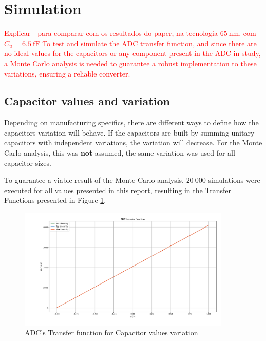 \section{Simulation}
\label{sec:simulation}


\textcolor{red}{Explicar - para comparar com os resultados do paper, na tecnologia $\SI{65}{\nano\meter}$, com $C_u = \SI{6.5}{\femto\farad}$ To test and simulate the ADC transfer function, and since there are no ideal values for the capacitors or any component present in the ADC in study, a Monte Carlo analysis is needed to guarantee a robust implementation to these variations, ensuring a reliable converter.}

\subsection{Capacitor values and variation}

Depending on manufacturing specifics, there are different ways to define how the capacitors variation will behave. If the capacitors are built by summing unitary capacitors with independent variations, the variation will decrease. For the Monte Carlo analysis, this was \textbf{not} assumed, the same variation was used for all capacitor sizes.

To guarantee a viable result of the Monte Carlo analysis, $20~000$ simulations were executed for all values presented in this report, resulting in the Transfer Functions presented in Figure \ref{fig:ADC_TF_ALLCAPS}.

\begin{figure}[H]

    \centering
    \includegraphics*[width=0.9\textwidth]{Images/ADC_TransFunc_All_Caps_20Ksim_s0011.png}
    \caption{ADC's Transfer function for Capacitor values variation}

    \label{fig:ADC_TF_ALLCAPS}
\end{figure}

